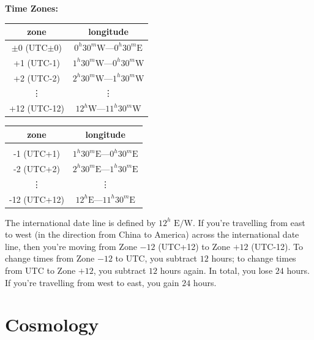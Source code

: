 \documentclass[12pt]{article}
\begin{document}
\textbf{Time Zones:} 

\begin{center}
\begin{tabular}{|c|c|}
\hline
zone & longitude \\
\hline\hline
$\pm 0$ (UTC$\pm$0) & $0^{h}30^{m}\text{W}$—$0^{h}30^{m}\text{E}$  \\
\hline
+1 (UTC-1) & $1^{h}30^{m}\text{W}$—$0^{h}30^{m}\text{W}$  \\
\hline
+2 (UTC-2) & $2^{h}30^{m}\text{W}$—$1^{h}30^{m}\text{W}$  \\
\hline
   \vdots  &\vdots  \\
\hline
+12 (UTC-12) & $12^{h}\text{W}$—$11^{h}30^{m}\text{W}$  \\
\hline
\end{tabular}
\begin{tabular}{|c|c|}
\hline
zone & longitude \\
\hline\hline
&  \\
\hline
-1 (UTC+1) & $1^{h}30^{m}\text{E}$—$0^{h}30^{m}\text{E}$  \\
\hline
-2 (UTC+2) & $2^{h}30^{m}\text{E}$—$1^{h}30^{m}\text{E}$  \\
\hline
   \vdots  &\vdots  \\
\hline
-12 (UTC+12) & $12^{h}\text{E}$—$11^{h}30^{m}\text{E}$  \\
\hline
\end{tabular}
\end{center}




The international date line is defined by $12^{h}\text{ E/W}$. If you're travelling from east to west (in the direction from China to America) across the international date line, then you're moving from Zone $-12$ (UTC+12) to Zone $+12$ (UTC-12). To change times from Zone $-12$ to UTC, you subtract $12$ hours; to change times from UTC to Zone $+12$, you subtract $12$ hours again. In total, you lose $24$ hours. If you're travelling from west to east, you gain $24$ hours.

\newpage
\section{Cosmology}
\end{document}
